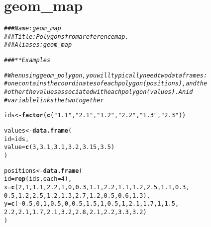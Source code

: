 \documentclass[a4paper,titlepage]{tufte-handout}\usepackage[]{graphicx}\usepackage[]{color}
\makeatletter
\newcommand{\hlnum}[1]{\textcolor[rgb]{0.686,0.059,0.569}{#1}}%
\newcommand{\hlstr}[1]{\textcolor[rgb]{0.192,0.494,0.8}{#1}}%
\newcommand{\hlcom}[1]{\textcolor[rgb]{0.678,0.584,0.686}{\textit{#1}}}%
\newcommand{\hlopt}[1]{\textcolor[rgb]{0,0,0}{#1}}%
\newcommand{\hlstd}[1]{\textcolor[rgb]{0.345,0.345,0.345}{#1}}%
\newcommand{\hlkwb}[1]{\textcolor[rgb]{0.69,0.353,0.396}{#1}}%
\newcommand{\hlkwc}[1]{\textcolor[rgb]{0.333,0.667,0.333}{#1}}%
\newcommand{\hlkwd}[1]{\textcolor[rgb]{0.737,0.353,0.396}{\textbf{#1}}}%
\newenvironment{kframe}{%
 \def\at@end@of@kframe{}%
 \ifinner\ifhmode%
  \def\at@end@of@kframe{\end{minipage}}%
  \begin{minipage}{\columnwidth}%
 \fi\fi%
 \def\FrameCommand##1{\hskip\@totalleftmargin \hskip-\fboxsep
 \colorbox{shadecolor}{##1}\hskip-\fboxsep
     \hskip-\linewidth \hskip-\@totalleftmargin \hskip\columnwidth}%
 \MakeFramed {\advance\hsize-\width
   \@totalleftmargin\z@ \linewidth\hsize
   \@setminipage}}%
 {\par\unskip\endMakeFramed%
 \at@end@of@kframe}
\newenvironment{knitrout}{}{} %
\makeatother
\begin{document}
\section{geom\_map}

\begin{knitrout}
\color{fgcolor}\begin{kframe}
\begin{alltt}
\hlcom{### Name: geom_map}
\hlcom{### Title: Polygons from a reference map.}
\hlcom{### Aliases: geom_map}

\hlcom{### ** Examples}

\hlcom{# When using geom_polygon, you will typically need two data frames:}
\hlcom{# one contains the coordinates of each polygon (positions),  and the}
\hlcom{# other the values associated with each polygon (values).  An id}
\hlcom{# variable links the two together}

\hlstd{ids} \hlkwb{<-} \hlkwd{factor}\hlstd{(}\hlkwd{c}\hlstd{(}\hlstr{"1.1"}\hlstd{,} \hlstr{"2.1"}\hlstd{,} \hlstr{"1.2"}\hlstd{,} \hlstr{"2.2"}\hlstd{,} \hlstr{"1.3"}\hlstd{,} \hlstr{"2.3"}\hlstd{))}

\hlstd{values} \hlkwb{<-} \hlkwd{data.frame}\hlstd{(}
  \hlkwc{id} \hlstd{= ids,}
  \hlkwc{value} \hlstd{=} \hlkwd{c}\hlstd{(}\hlnum{3}\hlstd{,} \hlnum{3.1}\hlstd{,} \hlnum{3.1}\hlstd{,} \hlnum{3.2}\hlstd{,} \hlnum{3.15}\hlstd{,} \hlnum{3.5}\hlstd{)}
\hlstd{)}

\hlstd{positions} \hlkwb{<-} \hlkwd{data.frame}\hlstd{(}
  \hlkwc{id} \hlstd{=} \hlkwd{rep}\hlstd{(ids,} \hlkwc{each} \hlstd{=} \hlnum{4}\hlstd{),}
  \hlkwc{x} \hlstd{=} \hlkwd{c}\hlstd{(}\hlnum{2}\hlstd{,} \hlnum{1}\hlstd{,} \hlnum{1.1}\hlstd{,} \hlnum{2.2}\hlstd{,} \hlnum{1}\hlstd{,} \hlnum{0}\hlstd{,} \hlnum{0.3}\hlstd{,} \hlnum{1.1}\hlstd{,} \hlnum{2.2}\hlstd{,} \hlnum{1.1}\hlstd{,} \hlnum{1.2}\hlstd{,} \hlnum{2.5}\hlstd{,} \hlnum{1.1}\hlstd{,} \hlnum{0.3}\hlstd{,}
  \hlnum{0.5}\hlstd{,} \hlnum{1.2}\hlstd{,} \hlnum{2.5}\hlstd{,} \hlnum{1.2}\hlstd{,} \hlnum{1.3}\hlstd{,} \hlnum{2.7}\hlstd{,} \hlnum{1.2}\hlstd{,} \hlnum{0.5}\hlstd{,} \hlnum{0.6}\hlstd{,} \hlnum{1.3}\hlstd{),}
  \hlkwc{y} \hlstd{=} \hlkwd{c}\hlstd{(}\hlopt{-}\hlnum{0.5}\hlstd{,} \hlnum{0}\hlstd{,} \hlnum{1}\hlstd{,} \hlnum{0.5}\hlstd{,} \hlnum{0}\hlstd{,} \hlnum{0.5}\hlstd{,} \hlnum{1.5}\hlstd{,} \hlnum{1}\hlstd{,} \hlnum{0.5}\hlstd{,} \hlnum{1}\hlstd{,} \hlnum{2.1}\hlstd{,} \hlnum{1.7}\hlstd{,} \hlnum{1}\hlstd{,} \hlnum{1.5}\hlstd{,}
  \hlnum{2.2}\hlstd{,} \hlnum{2.1}\hlstd{,} \hlnum{1.7}\hlstd{,} \hlnum{2.1}\hlstd{,} \hlnum{3.2}\hlstd{,} \hlnum{2.8}\hlstd{,} \hlnum{2.1}\hlstd{,} \hlnum{2.2}\hlstd{,} \hlnum{3.3}\hlstd{,} \hlnum{3.2}\hlstd{)}
\hlstd{)}


\end{alltt}
\end{kframe}
\end{knitrout}
\end{document}
